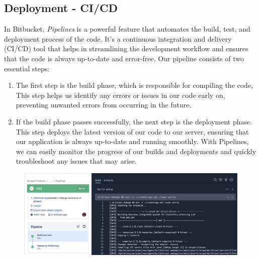\subsection{Deployment - CI/CD}\label{subsec:deployment---ci/cd}
In Bitbucket, \textit{Pipelines} is a powerful feature that automates the build, test, and deployment process of the code.
It's a continuous integration and delivery (CI/CD) tool that helps in streamlining the development workflow and ensures that the code is always up-to-date and error-free.
Our pipeline consists of two essential steps:
\begin{enumerate}
    \item The first step is the build phase, which is responsible for compiling the code, This step helps us identify any errors or issues in our code early on, preventing unwanted errors from occurring in the future.
    \item If the build phase passes successfully, the next step is the deployment phase. This step deploys the latest version of our code to our server, ensuring that our application is always up-to-date and running smoothly.
    With Pipelines, we can easily monitor the progress of our builds and deployments and quickly troubleshoot any issues that may arise.
\end{enumerate}


\begin{figure}[h!]
    \centering
    \includegraphics[width=\textwidth, keepaspectratio]{resources/pipeline.png}\label{fig:bitbucket-pipeline}
\end{figure}